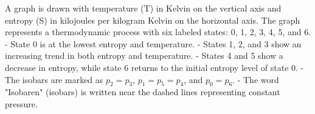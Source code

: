 A graph is drawn with temperature (T) in Kelvin on the vertical axis and entropy (S) in kilojoules per kilogram Kelvin on the horizontal axis. The graph represents a thermodynamic process with six labeled states: 0, 1, 2, 3, 4, 5, and 6.  
- State 0 is at the lowest entropy and temperature.  
- States 1, 2, and 3 show an increasing trend in both entropy and temperature.  
- States 4 and 5 show a decrease in entropy, while state 6 returns to the initial entropy level of state 0.  
- The isobars are marked as \( p_2 = p_3 \), \( p_1 = p_5 = p_4 \), and \( p_0 = p_6 \).  
- The word "Isobaren" (isobars) is written near the dashed lines representing constant pressure.